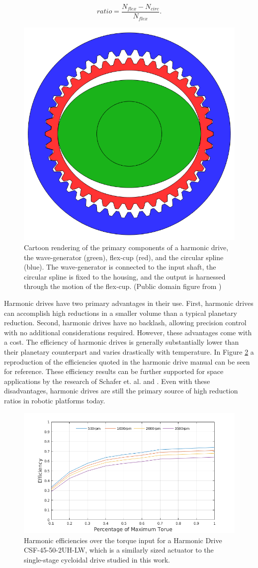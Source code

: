 \begin{equation} \label{eq:harmonic_ratio}
ratio = \frac{N_{flex} - N_{circ}} {N_{flex}}.
\end{equation}

\begin{figure}[t]
   \centering
   \includegraphics[width=0.3\linewidth]{fig/harmonic_blank}
   \caption{Cartoon rendering of the primary components of a harmonic drive, the wave-generator (green), flex-cup (red), and the circular spline (blue). The wave-generator is connected to the input shaft, the circular spline is fixed to the housing, and the output is harnessed through the motion of the flex-cup. (Public domain figure from \cite{ref:harmonic_cartoon})}
   \label{fig:harmonic_cartoon}
\end{figure}

Harmonic drives have two primary advantages in their use. First, harmonic drives can accomplish high reductions in a smaller volume than a typical planetary reduction. Second, harmonic drives have no backlash, allowing precision control with no additional considerations required. However, these advantages come with a cost. The efficiency of harmonic drives is generally substantially lower than their planetary counterpart and varies drastically with temperature. In Figure \ref{fig:harmonic_eff} a reproduction of the efficiencies quoted in the harmonic drive manual \cite{ref:harmonic_sheet} can be seen for reference. These efficiency results can be further supported for space applications by the research of Schafer et. al. \cite{ref:harmonic_space_lube} and \cite{ref:harmonic_performance}. Even with these disadvantages, harmonic drives are still the primary source of high reduction ratios in robotic platforms today. 

\begin{figure}[t]
   \centering
   \includegraphics[width=0.9\linewidth]{fig/harmonic_eff}
   \caption{Harmonic efficiencies over the torque input for a Harmonic Drive CSF-45-50-2UH-LW, which is a similarly sized actuator to the single-stage cycloidal drive studied in this work.}
   \label{fig:harmonic_eff}
\end{figure}

